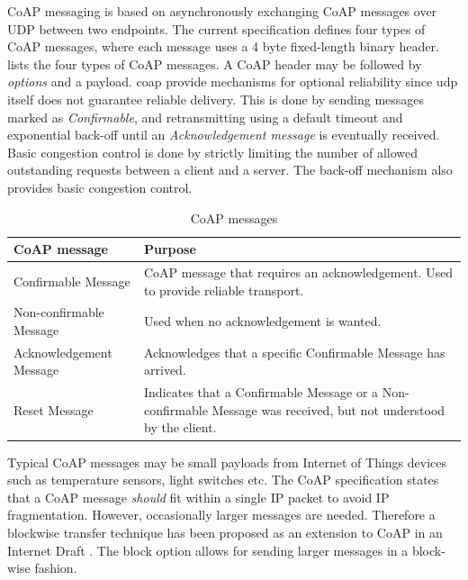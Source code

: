 CoAP messaging is based on asynchronously exchanging CoAP messages over UDP
between two endpoints. The current specification defines four types of CoAP
messages, where each message uses a 4 byte fixed-length binary header.
 lists the four types of CoAP messages. A CoAP header
may be followed by \textit{options} and a payload. \Gls{coap} provide mechanisms
for optional reliability since \gls{udp} itself does not guarantee reliable
delivery. This is done by sending messages marked as \textit{Confirmable}, and
retransmitting using a default timeout and exponential back-off until an
\textit{Acknowledgement message} is eventually received. Basic congestion
control is done by strictly limiting the number of allowed outstanding requests
between a client and a server. The back-off mechanism also provides basic
congestion control.

\begin{table}[h]
\centering
\begin{tabularx}{\textwidth}{|X|X|}
\hline
\textbf{CoAP message}   & \textbf{Purpose}                                                                                                  \\ \hline
Confirmable Message     & CoAP message that  requires an acknowledgement. Used to provide reliable transport.                               \\ \hline
Non-confirmable Message & Used when no acknowledgement is wanted.                                                                           \\ \hline
Acknowledgement Message & Acknowledges that a specific Confirmable Message has arrived.                                                     \\ \hline
Reset Message           & Indicates that a Confirmable Message or a Non-confirmable Message was received, but not understood by the client. \\ \hline
\end{tabularx}

\caption{CoAP messages}
\label{table:coap-messages}
\end{table}

Typical CoAP messages may be small payloads from Internet of Things devices such
as temperature sensors, light switches etc. The CoAP specification states that a
CoAP message \textit{should} fit within a single IP packet to avoid IP
fragmentation. However, occasionally larger messages are needed. Therefore a
blockwise transfer technique has been proposed as an extension to CoAP in an
Internet Draft \cite{draft-coap-blockwise}. The block option allows for sending
larger messages in a block-wise fashion.

